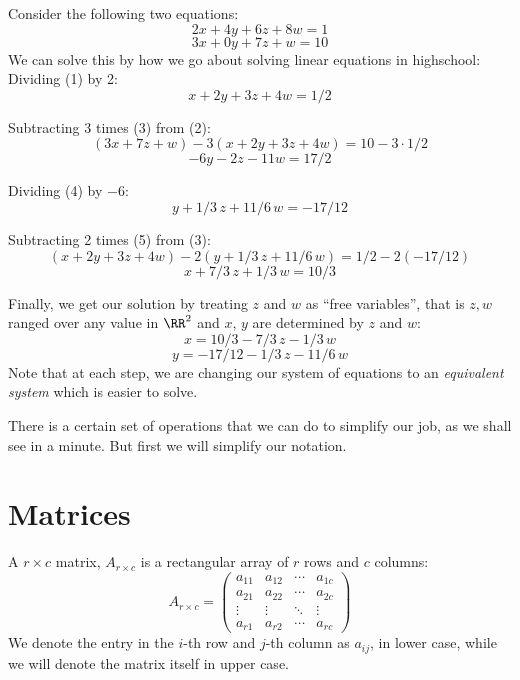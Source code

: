\newpage
\begin{example}
Consider the following two equations:
\[
2x + 4y + 6z + 8w = 1 \tag{1}
\]
\[
3x + 0y + 7z + w = 10 \tag{2}
\]
We can solve this by how we go about solving linear equations in highschool:
{Dividing (1) by 2:}
\[
x + 2y + 3z + 4w = 1/2 \tag{3}
\]

{Subtracting 3 times (3) from (2):}
\[
(3x + 7z + w) - 3(x + 2y + 3z + 4w) = 10 - 3\cdot 1/2
\]
\[
-6y - 2z - 11w = 17/2 \tag{4}
\]

{Dividing (4) by $-6$:}
\[
y + 1/3\, z + 11/6\, w = -17/12 \tag{5}
\]

{Subtracting 2 times (5) from (3):}
\[
(x + 2y + 3z + 4w) - 2\left(y + 1/3\, z + 11/6\, w\right) = 1/2 - 2\left(-17/12\right)
\]
\[
x + 7/3\, z + 1/3\, w = 10/3 \tag{6}
\]

Finally, we get our solution by treating $z$ and $w$ as ``free variables'',
that is $z, w$ ranged over any value in $\RR^2$
and $x$, $y$ are determined by $z$ and $w$:
\[
x = 10/3 - 7/3\, z - 1/3\, w
\]
\[
y = -17/12 - 1/3\, z - 11/6\, w
\]
Note that at each step, we are changing our system of equations to an
\emph{equivalent system} which is easier to solve.
\label{exm:equivalent-systems}
\end{example}

There is a certain set of operations that we can do to simplify our job, as we shall see
in a minute. But first we will simplify our notation.

\section{Matrices}

\begin{definition}[Matrices]
    A $r \times c$ matrix, $A_{r \times c}$ is a rectangular array of $r$ rows and $c$ columns:
    \begin{equation}
    A_{r \times c} = \begin{pmatrix}
        a_{11} & a_{12} & \cdots & a_{1c} \\
        a_{21} & a_{22} & \cdots & a_{2c} \\
        \vdots & \vdots & \ddots & \vdots \\
        a_{r1} & a_{r2} & \cdots & a_{rc}
    \end{pmatrix}
    \end{equation}
    We denote the entry in the $i$-th row and $j$-th column as $a_{ij}$, in lower case, while
    we will denote the matrix itself in upper case.
\end{definition}

